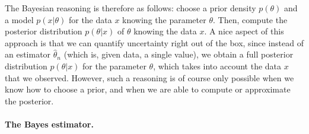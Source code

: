 \documentclass[
	fontsize=11pt, %
	twoside=false, %
	numbers=noenddot, %
]{kaobook}
\newcommand{\E}{\mathbb E}
\newcommand{\wh}{\widehat}
\newcommand{\ind}[1]{\mathbf 1_{#1}}
\begin{document}
The Bayesian reasoning is therefore as follows: choose a prior density $p(\theta)$ and a model $p(x | \theta)$ for the data $x$ knowing the parameter $\theta$.
Then, compute%
%
the posterior distribution $p(\theta | x)$ of $\theta$ knowing the data $x$. 
A nice aspect of this approach is that we can quantify uncertainty right out of the box, since instead of an estimator $\wh \theta_n$ (which is, given data, a single value), we obtain a full posterior distribution $p(\theta | x)$ for the parameter $\theta$, which takes into account the data $x$ that we observed.
However, such a reasoning is of course only possible when we know how to choose a prior, and when we are able to compute or approximate the posterior.

\paragraph{The Bayes estimator.} %


\end{document}
